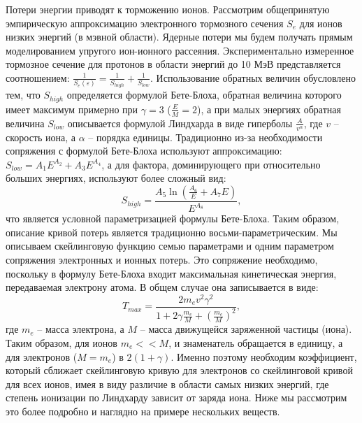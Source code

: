 \documentclass[a4paper,12pt]{article}
\begin{document}
\begin{large}
  Потери энергии приводят к торможению ионов.
  Рассмотрим общепринятую эмпирическую аппроксимацию электронного тормозного сечения $S_e$ для ионов низких энергий (в мэвной области).
  Ядерные потери мы будем получать прямым моделированием упругого ион-ионного рассеяния.
  Экспериментально измеренное тормозное сечение для протонов в области энергий до 10 МэВ представляется соотношением: $\frac{1}{S_e(\varepsilon)}=\frac{1}{S_{high}}+\frac{1}{S_{low}}$.
  Использование обратных величин обусловлено тем, что $S_{high}$ определяется формулой Бете-Блоха, обратная величина которого имеет максимум примерно при $\gamma=3$ ($\frac{E}{M}=2$), а при малых энергиях обратная величина $S_{low}$ описывается формулой Линдхарда в виде гиперболы $\frac{A}{v^\alpha}$, где $v$ -- скорость иона, а $\alpha$ -- порядка единицы. 
  Традиционно из-за необходимости сопряжения с формулой Бете-Блоха используют аппроксимацию: $S_{low}=A_1E^{A_2}+A_3E^{A_4}$, а для фактора, доминирующего при относительно больших энергиях, используют более сложный вид:
  \begin{equation}
  \label{Snepsilon}
  S_{high}=\frac{A_5\ln(\frac{A_6}{E}+A_7E)}{E^{A_8}},
  \end{equation}
  что является условной параметризацией формулы Бете-Блоха.
  Таким образом, описание кривой потерь является традиционно восьми-параметрическим.
  Мы описываем скейлинговую функцию семью параметрами и одним параметром сопряжения электронных и ионных потерь.
  Это сопряжение необходимо, поскольку в формулу Бете-Блоха входит максимальная кинетическая энергия, передаваемая электрону атома.
  В общем случае она записывается в виде:
  \begin{equation}
  \label{Tmax}
  T_{max}=\frac{2m_ev^2\gamma^2}{1+2\gamma\frac{m_e}{M}+(\frac{m_e}{M})^2},
  \end{equation}
  где $m_e$ -- масса электрона, а $M$ -- масса движущейся заряженной частицы (иона).
  Таким образом, для ионов $m_e << M$, и знаменатель обращается в единицу, а для электронов ($M=m_e$) в $2(1+\gamma)$.
  Именно поэтому необходим коэффициент, который сближает скейлинговую кривую для электронов со скейлинговой кривой для всех ионов, имея в виду различие в области самых низких энергий, где степень ионизации по Линдхарду зависит от заряда иона.
  Ниже мы рассмотрим это более подробно и наглядно на примере нескольких веществ.


\end{large}
\end{document}
